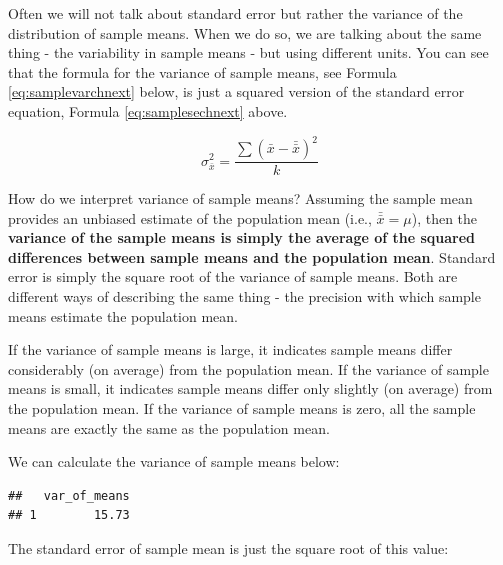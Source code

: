\documentclass[
]{krantz}
\makeatletter
\newenvironment{Shaded}{\begin{snugshade}}{\end{snugshade}}
\newcommand{\DataTypeTok}[1]{\textcolor[rgb]{0.27,0.27,0.27}{#1}}
\newcommand{\KeywordTok}[1]{\textcolor[rgb]{0.27,0.27,0.27}{\textbf{#1}}}
\newcommand{\NormalTok}[1]{#1}
\newcommand{\OperatorTok}[1]{\textcolor[rgb]{0.43,0.43,0.43}{\textbf{#1}}}
\newcommand{\StringTok}[1]{\textcolor[rgb]{0.5,0.5,0.5}{#1}}
\newenvironment{kframe}{%
\medskip{}
\setlength{\fboxsep}{.8em}
 \def\at@end@of@kframe{}%
 \ifinner\ifhmode%
  \def\at@end@of@kframe{\end{minipage}}%
  \begin{minipage}{\columnwidth}%
 \fi\fi%
 \def\FrameCommand##1{\hskip\@totalleftmargin \hskip-\fboxsep
 \colorbox{shadecolor}{##1}\hskip-\fboxsep
     \hskip-\linewidth \hskip-\@totalleftmargin \hskip\columnwidth}%
 \MakeFramed {\advance\hsize-\width
   \@totalleftmargin\z@ \linewidth\hsize
   \@setminipage}}%
 {\par\unskip\endMakeFramed%
 \at@end@of@kframe}
\renewenvironment{Shaded}{\begin{kframe}}{\end{kframe}}
\makeatother
\begin{document}
Often we will not talk about standard error but rather the variance of the distribution of sample means. When we do so, we are talking about the same thing - the variability in sample means - but using different units. You can see that the formula for the variance of sample means, see Formula \eqref{eq:samplevarchnext} below, is just a squared version of the standard error equation, Formula \eqref{eq:samplesechnext} above.

\begin{equation} 
\sigma_{\bar{x}}^2 = \frac{\sum{(\bar{x} - \bar{\bar{x}})^2}}{k}
      \label{eq:samplevarchnext}
\end{equation}

How do we interpret variance of sample means? Assuming the sample mean provides an unbiased estimate of the population mean (i.e., \(\bar{\bar{x}} = \mu\)), then the \textbf{variance of the sample means is simply the average of the squared differences between sample means and the population mean}. Standard error is simply the square root of the variance of sample means. Both are different ways of describing the same thing - the precision with which sample means estimate the population mean.

If the variance of sample means is large, it indicates sample means differ considerably (on average) from the population mean. If the variance of sample means is small, it indicates sample means differ only slightly (on average) from the population mean. If the variance of sample means is zero, all the sample means are exactly the same as the population mean.

We can calculate the variance of sample means below:

\begin{Shaded}
\end{Shaded}

\begin{verbatim}
##   var_of_means
## 1        15.73
\end{verbatim}

The standard error of sample mean is just the square root of this value:

\begin{Shaded}
\end{Shaded}
\end{document}
